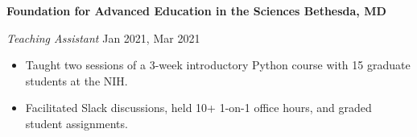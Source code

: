\textbf{Foundation for Advanced Education in the Sciences \hfill Bethesda, MD} \par
\textit{Teaching Assistant} \hfill Jan 2021, Mar 2021 \par
\begin{itemize}
	\item Taught two sessions of a 3-week introductory Python course with 15 graduate students at the NIH.
	\item Facilitated Slack discussions, held 10+ 1-on-1 office hours, and graded student assignments.
\end{itemize}\par